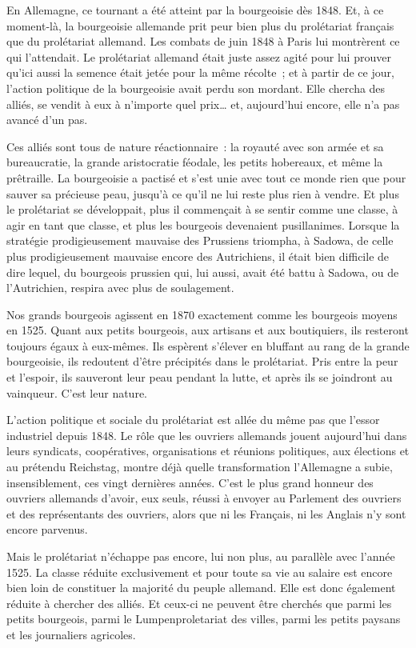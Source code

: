 \documentclass[french,twoside]{book} %
\begin{document}
En Allemagne, ce tournant a été atteint par la bourgeoisie dès 1848. Et, à ce moment-là, la bourgeoisie allemande prit peur bien plus du prolétariat français que du prolétariat allemand. Les combats de juin 1848 à Paris lui montrèrent ce qui l’attendait. Le prolétariat allemand était juste assez agité pour lui prouver qu’ici aussi la semence était jetée pour la même récolte ; et à partir de ce jour, l’action politique de la bourgeoisie avait perdu son mordant. Elle chercha des alliés, se vendit à eux à n’importe quel prix… et, aujourd’hui encore, elle n’a pas avancé d’un pas.\par
Ces alliés sont tous de nature réactionnaire : la royauté avec son armée et sa bureaucratie, la grande aristocratie féodale, les petits hobereaux, et même la prêtraille. La bourgeoisie a pactisé et s’est unie avec tout ce monde rien que pour sauver sa précieuse peau, jusqu’à ce qu’il ne lui reste plus rien à vendre. Et plus le prolétariat se développait, plus il commençait à se sentir comme une classe, à agir en tant que classe, et plus les bourgeois devenaient pusillanimes. Lorsque la stratégie prodigieusement mauvaise des Prussiens triompha, à Sadowa, de celle plus prodigieusement mauvaise encore des Autrichiens, il était bien difficile de dire lequel, du bourgeois prussien qui, lui aussi, avait été battu à Sadowa, ou de l’Autrichien, respira avec plus de soulagement.\par
Nos grands bourgeois agissent en 1870 exactement comme les bourgeois moyens en 1525. Quant aux petits bourgeois, aux artisans et aux boutiquiers, ils resteront toujours égaux à eux-mêmes. Ils espèrent s’élever en bluffant au rang de la grande bourgeoisie, ils redoutent d’être précipités dans le prolétariat. Pris entre la peur et l’espoir, ils sauveront leur peau pendant la lutte, et après ils se joindront au vainqueur. C’est leur nature.\par
L’action politique et sociale du prolétariat est allée du même pas que l’essor industriel depuis 1848. Le rôle que les ouvriers allemands jouent aujourd’hui dans leurs syndicats, coopératives, organisations et réunions politiques, aux élections et au prétendu Reichstag, montre déjà quelle transformation l’Allemagne a subie, insensiblement, ces vingt dernières années. C’est le plus grand honneur des ouvriers allemands d’avoir, eux seuls, réussi à envoyer au Parlement des ouvriers et des représentants des ouvriers, alors que ni les Français, ni les Anglais n’y sont encore parvenus.\par
Mais le prolétariat n’échappe pas encore, lui non plus, au parallèle avec l’année 1525. La classe réduite exclusivement et pour toute sa vie au salaire est encore bien loin de constituer la majorité du peuple allemand. Elle est donc également réduite à chercher des alliés. Et ceux-ci ne peuvent être cherchés que parmi les petits bourgeois, parmi le Lumpenproletariat des villes, parmi les petits paysans et les journaliers agricoles.\par
\end{document}
